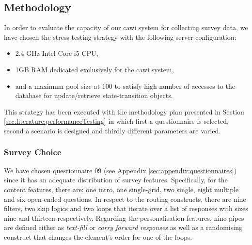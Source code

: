 

	\subsection{Methodology}
		In order to evaluate the capacity of our \gls{cawi} system for collecting survey data, we have chosen the stress testing strategy with the following server configuration:
		\begin{itemize}
			\item 2.4 GHz Intel Core i5 CPU,
			\item 1GB RAM dedicated exclusively for the \gls{cawi} system, %
			\item and a maximum pool size at 100 to satisfy high number of accesses to the database for update/retrieve state-transition objects. %
		\end{itemize}
		This strategy has been executed with the methodology plan presented in Section \ref{sec:literature:performanceTesting} in which first a questionnaire is selected, second a scenario is designed and thirdly different parameters are varied.
		
		\subsubsection{Survey Choice}

		We have chosen questionnaire 09 (see Appendix \ref{sec:appendix:questionnaires}) since it has an adequate distribution of survey features. Specifically, for the content features, there are: one intro, one single-grid, two single, eight multiple and six open-ended questions. In respect to the routing constructs, there are nine filters, two skip logics and two loops that iterate over a list of responses with sizes nine and thirteen respectively. Regarding the personalisation features, nine pipes are defined either as \emph{text-fill} or \emph{carry forward responses} as well as a randomising construct that changes the element's order for one of the loops.

